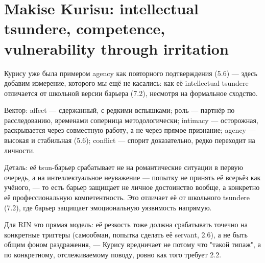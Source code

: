 \section{Makise Kurisu: intellectual tsundere, competence, vulnerability through irritation}

Курису уже была примером agency как повторного подтверждения (5.6) — здесь добавим измерение, которого мы ещё не касались: как её intellectual tsundere отличается от школьной версии барьера (7.2), несмотря на формальное сходство.

Вектор: affect — сдержанный, с редкими вспышками; роль — партнёр по расследованию, временами соперница методологически; intimacy — осторожная, раскрывается через совместную работу, а не через прямое признание; agency — высокая и стабильная (5.6); conflict — спорит доказательно, редко переходит на личности.

Деталь: её tsun-барьер срабатывает не на романтические ситуации в первую очередь, а на интеллектуальное неуважение — попытку не принять её всерьёз как учёного, — то есть барьер защищает не личное достоинство вообще, а конкретно её профессиональную компетентность. Это отличает её от школьного tsundere (7.2), где барьер защищает эмоциональную уязвимость напрямую.

Для RIN это прямая модель: её резкость тоже должна срабатывать точечно на конкретные триггеры (самообман, попытка сделать её servant, 2.6), а не быть общим фоном раздражения, — Курису вредничает не потому что "такой типаж", а по конкретному, отслеживаемому поводу, ровно как того требует 2.2.
